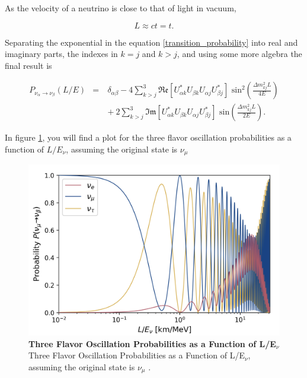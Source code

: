 As the velocity of a neutrino is close to that of light in vacuum,
 
\begin{equation}
	L \approx ct = t.
	\label{nu_L}
\end{equation}
 
Separating the exponential in the equation \ref{transition_probability} into real and imaginary parts, the indexes in $k=j$ and $k>j$, and using some more algebra the final result is
 
\begin{eqnarray}
	P_{\nu_\alpha \rightarrow \nu_\beta} (L/E) & = & \delta_{\alpha\beta} - 4\sum_{k>j}^3  \mathfrak{Re}[U^*_{\alpha k} U_{\beta k} U_{\alpha j} U^*_{\beta j}]\text{ sin}^2\left(\frac{\Delta m^2_{kj} L}{4E} \right) \nonumber \\
	& \quad & + \ 2\sum_{k>j}^3\mathfrak{Im}[U^*_{\alpha k} U_{\beta k} U_{\alpha j} U^*_{\beta j}]\text{ sin}\left(\frac{\Delta m^2_{kj} L}{2E} \right).
	\label{nu_oscillation_final}
\end{eqnarray}
 

In figure \ref{fig:nu_osc_prob}, you will find a plot for the three flavor oscillation probabilities as a function of $L/E_{\nu}$, assuming the original state is $\nu_{\mu}$

\begin{figure}[h!]
	\begin{center}
		\includegraphics[scale=0.2]{Figures/three_flavor_osc.jpg}
		\caption[Three Flavor Oscillation Model]{\textbf{Three Flavor Oscillation Probabilities as a Function of L/E$_{\nu}$} \\Three Flavor Oscillation Probabilities as a Function of L/E$_{\nu}$, assuming the original state is $\nu_{\mu}$ \cite{Lauren_thesis}.}
		\label{fig:nu_osc_prob}
	\end{center}
\end{figure}
 
